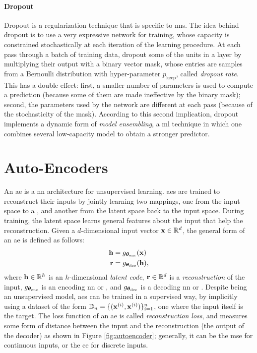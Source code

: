 \paragraph{Dropout}
Dropout \citep{srivastava2014dropout} is a regularization technique that is specific to \glspl{nn}. The idea behind dropout is to use a very expressive network for training, whose capacity is constrained stochastically at each iteration of the learning procedure. At each pass through a batch of training data, dropout  some of the units in a layer by multiplying their output with a binary vector mask, whose entries are samples from a Bernoulli distribution with hyper-parameter $p_{\mathrm{keep}}$, called \emph{dropout rate}. This has a double effect: first, a smaller number of parameters is used to compute a prediction (because some of them are made ineffective by the binary mask); second, the parameters used by the network are different at each pass (because of the stochasticity of the mask). According to this second implication, dropout implements a dynamic form of \emph{model ensembling}, a \gls{ml} technique in which one combines several low-capacity model to obtain a stronger predictor.

\section{Auto-Encoders}
An \gls{ae} \citep{baldi2012autoenc} is a \gls{nn} architecture for unsupervised learning. \glspl{ae} are trained to reconstruct their inputs by jointly learning two mappings, one from the input space to a , and another from the latent space back to the input space. During training, the latent space learns general features about the input that help the reconstruction. Given a $d$-dimensional input vector $\Vector{x} \in \Real^d$, the general form of an \gls{ae} is defined as follows:
\begin{align*}
    \Vector{h} &= g_{\Param_{\Fun{enc}}}(\Vector{x})\\
    \Vector{r} &= g_{\Param_{\Fun{dec}}}(\Vector{h}),
\end{align*}
where $\Vector{h} \in \Real^h$ is an $h$-dimensional \emph{latent code}, $\Vector{r} \in \Real^d$ is a \emph{reconstruction} of the input, $g_{\boldsymbol{\theta}_{\mathrm{enc}}}$ is an encoding \gls{nn} or , and $g_{\boldsymbol{\theta}_{\mathrm{dec}}}$ is a decoding \gls{nn} or . Despite being an unsupervised model, \glspl{ae} can be trained in a supervised way, by implicitly using a dataset of the form $\Data_n = \Set{(\VPattern{x}{i}, \VPattern{x}{i})}_{i=1}^n$, \ie one where the input itself is the target. The loss function of an \gls{ae} is called \emph{reconstruction loss}, and measures some form of distance between the input and the reconstruction (the output of the decoder) as shown in Figure \ref{fig:autoencoder}; generally, it can be the \gls{mse} for continuous inputs, or the \gls{ce} for discrete inputs.

